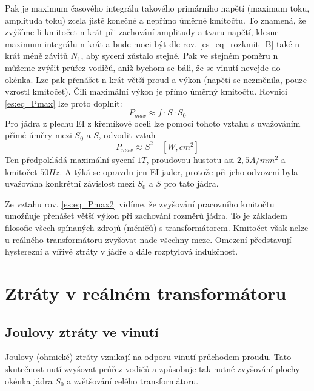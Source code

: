       Pak je maximum časového integrálu takového primárního napětí (maximum toku, amplituda toku) 
      zcela jistě konečné a nepřímo úměrné kmitočtu. To znamená, že zvýšíme-li kmitočet n-krát při 
      zachování amplitudy a tvaru napětí, klesne maximum integrálu n-krát a bude moci být dle rov. 
      \ref{es_eq_rozkmit_B} také n-krát méně závitů $N_1$, aby sycení zůstalo stejné. Pak ve 
      stejném poměru n můžeme zvýšit průřez vodičů, aniž bychom se báli, že se vinutí nevejde do 
      okénka. Lze pak přenášet n-krát větší proud a výkon (napětí se nezměnila, pouze vzrostl 
      kmitočet). Čili maximální výkon je přímo úměrný kmitočtu. Rovnici \ref{es:eq_Pmax} lze proto 
      doplnit:
      \begin{equation}\label{es:eq_Pmax2}
        P_{max} \approx f\cdot S\cdot S_0
      \end{equation}
      Pro jádra z plechu EI z křemíkové oceli lze pomocí tohoto vztahu s uvažováním přímé úměry 
      mezi $S_0$ a $S$, odvodit vztah
      \begin{equation}\label{es:eq_Pmax_EI}
        P_{max} \approx S^2\quad [W, cm^2]
      \end{equation}
      Ten předpokládá maximální sycení $1 T$, proudovou hustotu asi $2,5 A/mm^2$ a kmitočet $50 
      Hz$. A týká se opravdu jen EI jader, protože při jeho odvození byla uvažována konkrétní 
      závislost mezi $S_0$ a $S$ pro tato jádra.

      Ze vztahu rov. \ref{es:eq_Pmax2} vidíme, že zvyšování pracovního kmitočtu umožňuje přenášet 
      větší výkon při zachování rozměrů jádra. To je základem filosofie všech spínaných zdrojů 
      (měničů) s transformátorem. Kmitočet však nelze u reálného transformátoru zvyšovat nade 
      všechny meze. Omezení představují hysterezní a vířivé ztráty v jádře a dále rozptylová 
      indukčnost.

  \section{Ztráty v reálném transformátoru}
    \subsection{Joulovy ztráty ve vinutí}
      Joulovy (ohmické) ztráty vznikají na odporu vinutí průchodem proudu. Tato sku\-te\-čnost nutí 
      zvyšovat průřez vodičů a způsobuje tak nutné zvyšování plochy okénka jádra $S_0$ a zvětšování 
      celého transformátoru.

